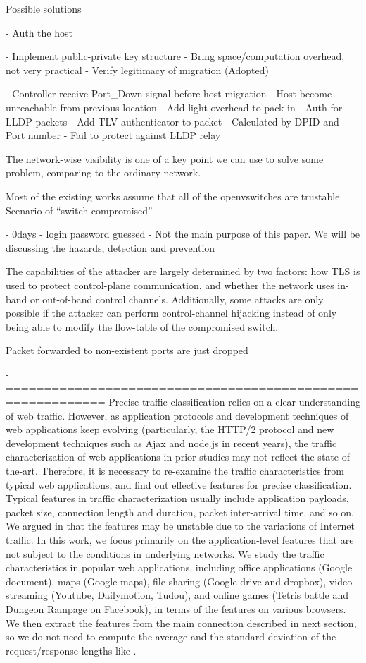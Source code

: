 Possible solutions

- Auth the host

    - Implement public-private key structure
    - Bring space/computation overhead, not very practical
- Verify legitimacy of migration (Adopted)

    - Controller receive Port\_Down signal before host migration
    - Host become unreachable from previous location
    - Add light overhead to pack-in
- Auth for LLDP packets
    - Add TLV authenticator to packet
    - Calculated by DPID and Port number
    - Fail to protect against LLDP relay


The network-wise visibility is one of a key point we can use to solve some problem, comparing to the ordinary network.

Most of the existing works assume that all of the openvswitches are trustable Scenario of “switch compromised”

- 0days
- login password guessed
- Not the main purpose of this paper. We will be discussing the hazards, detection and prevention

The capabilities of the attacker are largely determined by two
factors: how TLS is used to protect control-plane communication, and whether
the network uses in-band or out-of-band control channels. Additionally, some
attacks are only possible if the attacker can perform control-channel hijacking
instead of only being able to modify the flow-table of the compromised switch.

Packet forwarded to non-existent ports are just dropped

-===========================================================
Precise traffic classification relies on a clear understanding of web traffic. However, as application protocols and development techniques of web applications keep evolving (particularly, the HTTP/2 protocol \cite{HTTP2} and new development techniques such as Ajax and node.js in recent years), the traffic characterization of web applications in prior studies may not reflect the state-of-the-art. Therefore, it is necessary to re-examine the traffic characteristics from typical web applications, and find out effective features for precise classification. Typical features in traffic characterization usually include application payloads, packet size, connection length and duration, packet inter-arrival time, and so on. We argued in \cite{TFT14} that the features may be unstable due to the variations of Internet traffic. In this work, we focus primarily on the application-level features that are not subject to the conditions in underlying networks. We study the traffic characteristics in popular web applications, including office applications (Google document), maps (Google maps), file sharing (Google drive and dropbox), video streaming (Youtube, Dailymotion, Tudou), and online games (Tetris battle and Dungeon Rampage on Facebook), in terms of the features on various browsers. We then extract the features from the main connection described in next section, so we do not need to compute the average and the standard deviation of the request/response lengths like \cite{TFT14}. 

